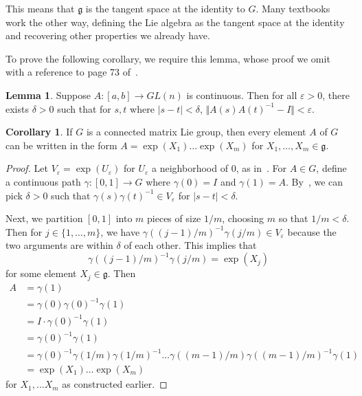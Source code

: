 \documentclass[12pt]{article}
\newcommand{\g}{\mathfrak{g}}
\newcommand{\V}{\Vert}
\theoremstyle{definition}
\theoremstyle{definition}
\newtheorem{cor}[them]{Corollary}
\theoremstyle{definition}
\newtheorem{lem}[them]{Lemma}
\theoremstyle{definition}
\theoremstyle{definition}
\theoremstyle{definition}
\theoremstyle{definition}
\theoremstyle{definition}
\begin{document}
\par{This means that $\g$ is the tangent space at
the identity to $G$. Many textbooks work the
other way, defining the Lie algebra as the
tangent space at the identity and recovering
other properties we already have.}

\vspace{6pt}
\par{To prove the following corollary, we require
this lemma, whose proof we omit with a reference
to page 73 of~\cite{Hall}.}

\begin{lem}\label{lem:3.46}
Suppose $A: [a, b] \to GL(n)$ is continuous.
Then for all $ \varepsilon > 0$, there exists $\delta >
0$ such that for $s, t$ where $|s-t| <
\delta$, $\V A(s) {A(t)}^{-1}-I \V < \varepsilon$.
\end{lem}

\begin{cor}\label{cor:3.47}
If $G$ is a connected matrix Lie group, then
every element $A$ of $G$ can be written in the
form $A = \exp(X_1)\hdots\exp(X_m)$
for $X_1, \hdots, X_m \in \g$.
\end{cor}
\begin{proof}
\par{Let $V_\varepsilon = \exp(U_\varepsilon)$ for
$U_\varepsilon$ a neighborhood of $0$, as
in~. For $A \in G$, define a
continuous path $\gamma: [0,1] \to G$ where
$\gamma(0) = I$ and $\gamma(1) = A$.
By~, we can pick $\delta > 0$
such that ${\gamma(s)\gamma(t)}^{-1} \in
V_\varepsilon$ for $|s - t| < \delta$.}

\par{Next, we partition $[0,1]$ into $m$ pieces of
size $1/m$, choosing $m$ so that $1/m < \delta$.
Then for $j \in \{1, \hdots, m\}$, we have
${\gamma((j-1)/m)}^{-1}\gamma(j/m) \in
V_\varepsilon$ because the two arguments are
within $\delta$ of each other. This implies that
\[
{\gamma((j-1)/m)}^{-1}\gamma(j/m) = \exp(X_j)
\] 
for some element $X_j \in \g$. Then
\[
\begin{aligned}
    A & = \gamma(1) \\
    & = \gamma(0) {\gamma(0)}^{-1} \gamma(1) \\
    & = I \cdot {\gamma(0)}^{-1} \gamma(1) \\
    & = {\gamma(0)}^{-1} \gamma(1) \\
    & = {\gamma(0)}^{-1} \gamma(1/m) 
    {\gamma(1/m)}^{-1} \hdots \gamma((m-1)/m)
    {\gamma((m-1)/m)}^{-1} \gamma(1) \\
    & = \exp(X_1) \hdots \exp(X_m) 
\end{aligned}
\] 
for $X_1, \hdots
X_m$ as constructed earlier.}   
\end{proof}
\end{document}

